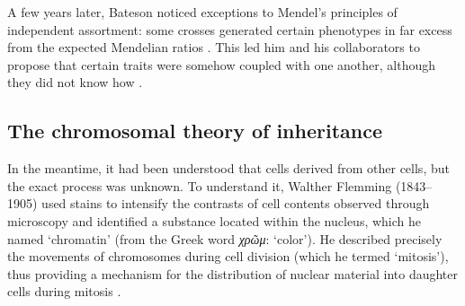 A few years later, Bateson noticed exceptions to Mendel's principles of independent assortment: some crosses generated certain phenotypes in far excess from the expected Mendelian ratios \citep{bateson1905experimentalpea}. This led him and his collaborators to propose that certain traits were somehow coupled with one another, although they did not know how \citep{bateson1905experimental}. 










\subsection{The chromosomal theory of inheritance}

In the meantime, it had been understood that cells derived from other cells, but the exact process was unknown. 
To understand it, Walther Flemming (1843--1905) used stains to intensify the contrasts of cell contents observed through microscopy and identified a substance located within the nucleus, which he named ‘chromatin’ (from the Greek word \textit{\textgreek{χρῶμ}\textalpha}: ‘color’).
He described precisely the movements of chromosomes during cell division (which he termed ‘mitosis’), thus providing a mechanism for the distribution of nuclear material into daughter cells during mitosis \citep{flemming1879contributions}.


